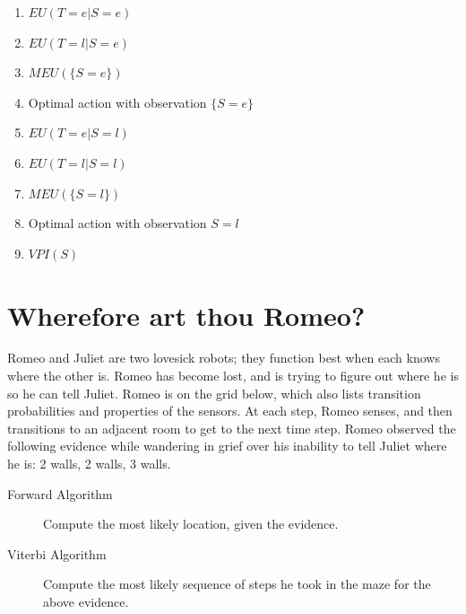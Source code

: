 \documentclass[12pt]{article}
\begin{document}
\begin{enumerate}

\item $EU(T=e | S = e)$

\item $EU(T=l | S = e)$

\item $MEU( \{ S=e \} )$

\item Optimal action with observation $\{S = e\}$

\item $EU(T = e | S = l)$

\item $EU(T = l | S = l)$

\item $MEU( \{ S=l \} )$

\item Optimal action with observation $S = l$

\item $VPI(S)$

\end{enumerate}

\section{Wherefore art thou Romeo?}

Romeo and Juliet are two lovesick robots; they function best when each
knows where the other is.  Romeo has become lost, and is trying to
figure out where he is so he can tell Juliet.  Romeo is on the grid
below, which also lists transition probabilities and properties of the
sensors.  At each step, Romeo senses, and then transitions to an
adjacent room to get to the next time step.  Romeo observed the
following evidence while wandering in grief over his inability to tell
Juliet where he is: 2 walls, 2 walls, 3 walls.

\begin{description}

\item[Forward Algorithm] Compute the most likely location, given the evidence.

\item[Viterbi Algorithm] Compute the most likely sequence of steps he
  took in the maze for the above evidence.

\end{description}

\clearpage
\end{document}
